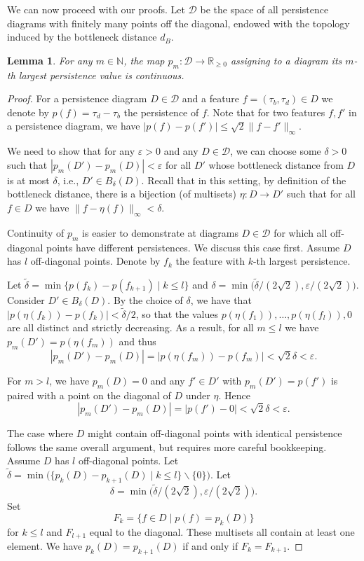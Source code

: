 \documentclass{article}
\theoremstyle{plain}
\newtheorem{lemma}[theorem]{Lemma}
\theoremstyle{definition}
\theoremstyle{remark}
\begin{document}
We can now proceed with our proofs. Let $\mathcal{D}$ be the space of all persistence diagrams with finitely many points off the diagonal, endowed with the topology induced by the bottleneck distance $d_B$. 

\begin{lemma}\label{lem:pm}
    For any $m \in \mathbb{N}$, the map $p_m:\mathcal{D} \to \mathbb{R}_{\geq 0}$ assigning to a diagram its $m$-th largest persistence value is continuous.
\end{lemma}
\begin{proof}
    For a persistence diagram $D \in \mathcal D$ and a feature $f=(\tau_b, \tau_d) \in D$ we denote by $p(f)=\tau_d - \tau_b$ the persistence of $f$. Note that for two features $f,f'$ in a persistence diagram, we have $|p(f)- p(f')| \leq \sqrt{2}\|f -f'\|_\infty$.
    
    We need to show that for any $\varepsilon > 0$ and any $D \in \mathcal{D}$, we can choose some $\delta>0$ such that $|p_m(D') -p_m(D)| < \varepsilon$ for all $D'$ whose bottleneck distance from $D$ is at most $\delta$, i.e., $D'\in B_{\delta}(D)$. Recall that in this setting, by definition of the bottleneck distance, there is a bijection (of multisets) $\eta: D \to D'$ such that for all $f\in D$ we have $\|f-\eta(f)\|_{\infty} < \delta$. 

    Continuity of $p_m$ is easier to demonstrate at diagrams $D\in \mathcal{D}$ for which all off-diagonal points have different persistences. We discuss this case first. Assume $D$ has $l$ off-diagonal points. Denote by $f_k$ the feature with $k$-th largest persistence. 

    Let $\tilde{\delta} = \min\{p(f_k)-p(f_{k+1}) \mid k\leq l\}$ and $\delta = \min\big(\tilde{\delta} / (2\sqrt{2}), \varepsilon/(2\sqrt{2})\big)$. Consider $D'\in B_{\delta}(D)$.  By the choice of $\delta$, we have that $|p(\eta(f_k)) - p(f_k)| < \tilde{\delta}/2$, so that the values $p(\eta(f_1)),\dots, p(\eta(f_l)), 0$ are all distinct and strictly decreasing. As a result, for all $m\leq l$ we have $p_m(D') = p(\eta(f_m))$ and thus
    $$|p_m(D') - p_m(D)| = |p(\eta(f_m)) - p(f_m)| < \sqrt{2} \delta < \varepsilon.$$

    For $m>l$, we have $p_m(D)=0$ and any $f'\in D'$ with $p_m(D')=p(f')$ is paired with a point on the diagonal of $D$ under $\eta$. Hence
    $$|p_m(D') - p_m(D)| = |p(f') - 0|  < \sqrt{2} \delta < \varepsilon.$$

    The case where $D$ might contain off-diagonal points with identical persistence follows the same overall argument, but requires more careful bookkeeping. Assume $D$ has $l$ off-diagonal points. Let $\tilde{\delta} = \min \big(\{p_k(D) - p_{k+1}(D) \mid k\leq l\}\backslash \{0\}\big)$. Let $$\delta = \min\big(\tilde{\delta}/(2\sqrt{2}), \varepsilon /(2\sqrt{2})\big).$$
    Set $$F_k = \{f\in D \mid p(f)= p_k(D)\}$$ for $k \leq l$ and $F_{l+1}$ equal to the diagonal. These multisets all contain at least one element. We have $p_k(D) = p_{k+1}(D)$ if and only if $F_k = F_{k+1}$.


\end{proof}
\end{document}
